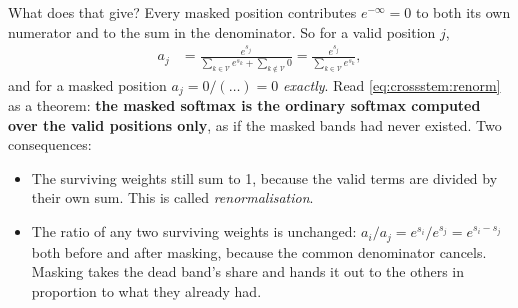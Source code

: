 What does that give? Every masked position contributes $e^{-\infty} = 0$ to both its own numerator and to the sum in the denominator. So for a valid position $j$,
\begin{align}
  a_j &= \frac{e^{s_j}}{\sum_{k\in\mathcal{V}}e^{s_k} + \sum_{k\notin\mathcal{V}}0}
       = \frac{e^{s_j}}{\sum_{k\in\mathcal{V}}e^{s_k}}, \label{eq:crossstem:renorm}
\end{align}
and for a masked position $a_j = 0/(\ldots) = 0$ \emph{exactly}. Read \cref{eq:crossstem:renorm} as a theorem: \textbf{the masked softmax is the ordinary softmax computed over the valid positions only}, as if the masked bands had never existed. Two consequences:
\begin{itemize}
\item The surviving weights still sum to 1, because the valid terms are divided by their own sum. This is called \emph{renormalisation}.
\item The ratio of any two surviving weights is unchanged: $a_i/a_j = e^{s_i}/e^{s_j} = e^{s_i - s_j}$ both before and after masking, because the common denominator cancels. Masking takes the dead band's share and hands it out to the others in proportion to what they already had.
\end{itemize}


